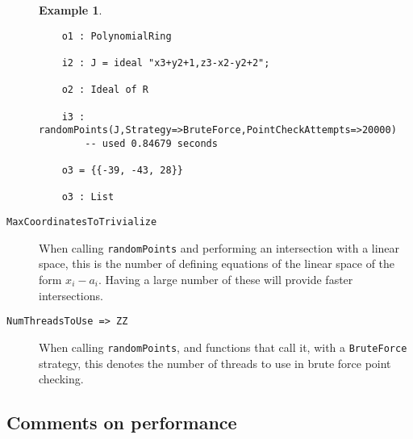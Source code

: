 \documentclass[11pt]{amsart}
\theoremstyle{definition}
\newtheorem{example}{Example}[section]
\begin{document}
\begin{description}
\begin{example}
{{\begin{verbatim}
	o1 : PolynomialRing

	i2 : J = ideal "x3+y2+1,z3-x2-y2+2";

	o2 : Ideal of R

	i3 : randomPoints(J,Strategy=>BruteForce,PointCheckAttempts=>20000)
		-- used 0.84679 seconds

	o3 = {{-39, -43, 28}}

	o3 : List
	\end{verbatim}
	}}
	\end{example}

	\vspace{1em}
	\item[\tt MaxCoordinatesToTrivialize]

	When calling {\tt randomPoints} and performing an intersection with a linear space, this is the number of defining equations of the linear space of the form $x_i - a_i$.  Having a large number of these will provide faster intersections.
	
	\vspace{1em}
	\item[\tt NumThreadsToUse => ZZ]

	When calling {\tt randomPoints}, and functions that call it, with a {\tt BruteForce} strategy, this denotes the number of threads to use in brute force point checking.
\end{description}

\subsection{Comments on performance}
\end{document}
